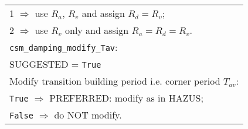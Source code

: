 \begin{tabular}{|p{\textwidth}|}
 \hspace{0.5em} 1 $\Rightarrow$ use $R_a$, $R_v$ and assign $R_d= R_v$; \\
 \hspace{0.5em} 2 $\Rightarrow$ use $R_v$ only and assign $R_a=R_d=R_v$. \\
\hline \vspace{0.1em} \texttt{csm\_damping\_modify\_Tav}: \\
SUGGESTED = \texttt{True} \\
Modify transition building period i.e. corner period $T_{av}$: \\
 \hspace{0.5em} \texttt{True} $\Rightarrow$ \small{PREFERRED}: modify as in HAZUS; \\
 \hspace{0.5em}  \texttt{False} $\Rightarrow$ do NOT modify. \\
 \hline
\end{tabular}





